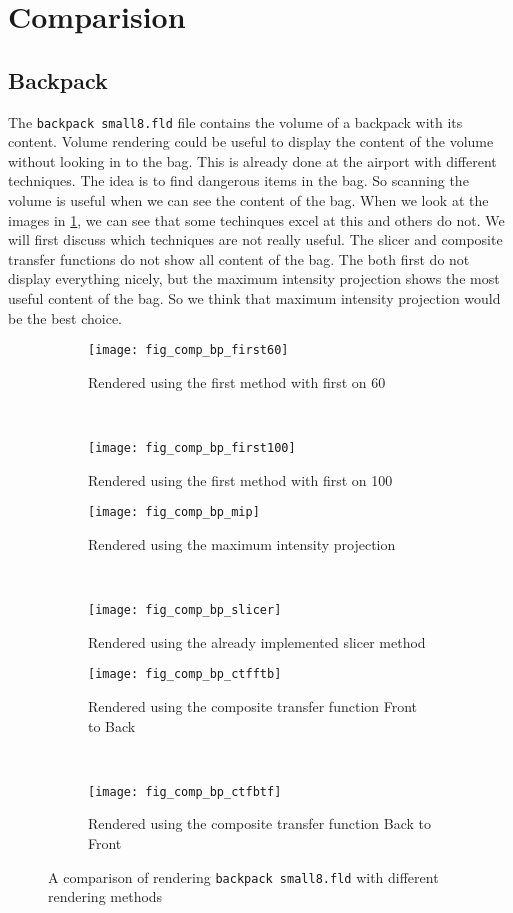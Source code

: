 \section{Comparision}\label{Sec:Com}
\subsection{Backpack}
The \texttt{backpack small8.fld} file contains the volume of a backpack with its content. 
Volume rendering could be useful to display the content of the volume without looking in to the bag.
This is already done at the airport with different techniques.
The idea is to find dangerous items in the bag. 
So scanning the volume is useful when we can see the content of the bag. 
When we look at the images in \ref{fig:comp:bp}, we can see that some techinques excel at this and others do not. 
We will first discuss which techniques are not really useful. 
The slicer and composite transfer functions do not show all content of the bag.
The both first do not display everything nicely, but the maximum intensity projection shows the  most useful content of the bag. 
So we think that maximum intensity projection would be the best choice.
\begin{figure}[H]
	\centering
	\begin{subfigure}[t]{0.45\textwidth}
		\texttt{[image: fig\_comp\_bp\_first60]}
		\caption{Rendered using the first method with first on 60}
	\end{subfigure}
	~%
	\begin{subfigure}[t]{0.45\textwidth}
		\texttt{[image: fig\_comp\_bp\_first100]}
		\caption{Rendered using the first method with first on 100}
	\end{subfigure}
	
	\begin{subfigure}[t]{0.45\textwidth}
		\texttt{[image: fig\_comp\_bp\_mip]}
		\caption{Rendered using the maximum intensity projection}
	\end{subfigure}
	~%
	\begin{subfigure}[t]{0.45\textwidth}
		\texttt{[image: fig\_comp\_bp\_slicer]}
		\caption{Rendered using the already implemented slicer method}
	\end{subfigure}

	\begin{subfigure}[t]{0.45\textwidth}
		\texttt{[image: fig\_comp\_bp\_ctfftb]}
		\caption{Rendered using the composite transfer function Front to Back}
	\end{subfigure}
	~%
	\begin{subfigure}[t]{0.45\textwidth}
		\texttt{[image: fig\_comp\_bp\_ctfbtf]}
		\caption{Rendered using the composite transfer function Back to Front}
	\end{subfigure}
	
	\caption{A comparison of rendering \texttt{backpack small8.fld} with different rendering methods}
	\label{fig:comp:bp}
\end{figure}

